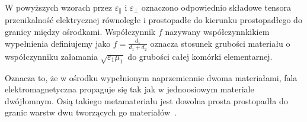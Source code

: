 W powyższych wzorach przez $\varepsilon_{\parallel}$ i $\varepsilon_{\perp}$ oznaczono odpowiednio składowe tensora przenikalność elektrycznej równoległe i prostopadłe do kierunku prostopadłego do granicy między ośrodkami. Współczynnik $f$ nazywany współczynnkikiem wypełnienia definiujemy jako $f=\frac{d_1}{d_1+d_2}$ oznacza stosunek grubości materiału o współczynniku załamania $\sqrt{\varepsilon_1 \mu_1}$ do grubości całej komórki elementarnej.

Oznacza to, że w ośrodku wypełnionym naprzemiennie dwoma materiałami, fala elektromagnetyczna propaguje się tak jak w jednoosiowym materiale dwójłomnym. Osią takiego metamateriału jest dowolna prosta prostopadła do granic warstw dwu tworzących go materiałów~\cite{sihvola1999electromagnetic}.







